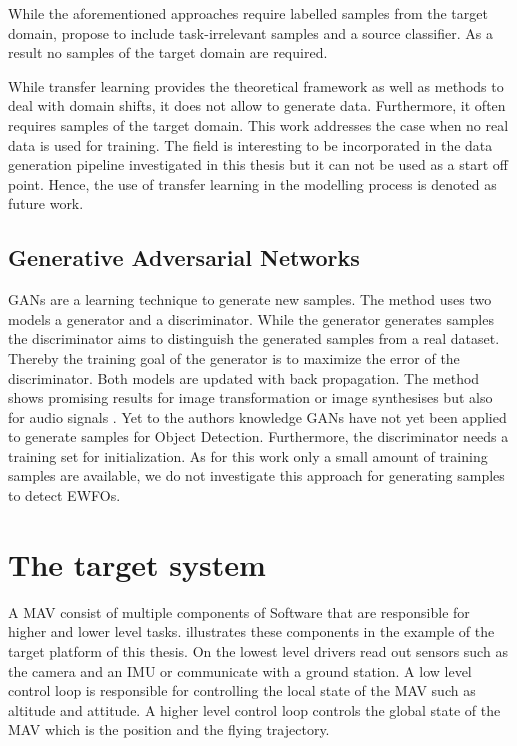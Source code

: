 While the aforementioned approaches require labelled samples from the target domain, \citeauthor{Peng2017} \cite{Peng2017} propose to include task-irrelevant samples and a source classifier. As a result no samples of the target domain are required.

While transfer learning provides the theoretical framework as well as methods to deal with domain shifts, it does not allow to generate data. Furthermore, it often requires samples of the target domain. This work addresses the case when no real data is used for training. The field is interesting to be incorporated in the data generation pipeline investigated in this thesis but it can not be used as a start off point. Hence, the use of transfer learning in the modelling process is denoted as future work.

\subsection{Generative Adversarial Networks}

\acp{GAN} \cite{Goodfellow2014} are a learning technique to generate new samples. The method uses two models a generator and a discriminator. While the generator generates samples the discriminator aims to distinguish the generated samples from a real dataset. Thereby the training goal of the generator is to maximize the error of the discriminator. Both models are updated with back propagation. The method shows promising results for image transformation or image synthesises but also for audio signals \cite{Creswell2017}. Yet to the authors knowledge \acp{GAN} have not yet been applied to generate samples for Object Detection. Furthermore, the discriminator needs a training set for initialization. As for this work only a small amount of training samples are available, we do not investigate this approach for generating samples to detect \acp{EWFO}.

\section{The target system}

A \ac{MAV} consist of multiple components of Software that are responsible for higher and lower level tasks.  illustrates these components in the example of the target platform of this thesis. On the lowest level drivers read out sensors such as the camera and an \ac{IMU} or communicate with a ground station. A low level control loop is responsible for controlling the local state of the \ac{MAV} such as altitude and attitude. A higher level control loop controls the global state of the \ac{MAV} which is the position and the flying trajectory.


